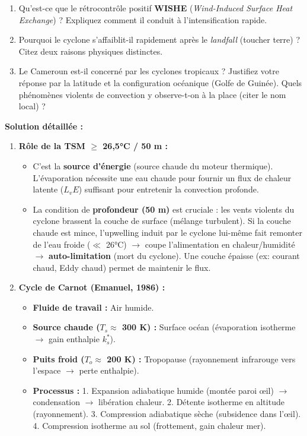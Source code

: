 \documentclass[11pt]{article}
\begin{document}
\begin{exoresolu}
\begin{enumerate}
    \item Qu'est-ce que le rétrocontrôle positif \textbf{WISHE} (\emph{Wind-Induced Surface Heat Exchange}) ? Expliquez comment il conduit à l'intensification rapide.
    \item Pourquoi le cyclone s'affaiblit-il rapidement après le \emph{landfall} (toucher terre) ? Citez deux raisons physiques distinctes.
    \item Le Cameroun est-il concerné par les cyclones tropicaux ? Justifiez votre réponse par la latitude et la configuration océanique (Golfe de Guinée). Quels phénomènes violents de convection y observe-t-on à la place (citer le nom local) ?
\end{enumerate}
\tcblower
\textbf{Solution détaillée :}
\begin{enumerate}
    \item \textbf{Rôle de la TSM $\ge$ 26,5°C / 50 m :}
          \begin{itemize}
              \item C'est la \textbf{source d'énergie} (source chaude du moteur thermique). L'évaporation nécessite une eau chaude pour fournir un flux de chaleur latente ($L_v E$) suffisant pour entretenir la convection profonde.
              \item La condition de \textbf{profondeur (50 m)} est cruciale : les vents violents du cyclone brassent la couche de surface (mélange turbulent). Si la couche chaude est mince, l'upwelling induit par le cyclone lui-même fait remonter de l'eau froide ($\ll$ 26°C) $\rightarrow$ coupe l'alimentation en chaleur/humidité $\rightarrow$ \textbf{auto-limitation} (mort du cyclone). Une couche épaisse (ex: courant chaud, Eddy chaud) permet de maintenir le flux.
          \end{itemize}
    \item \textbf{Cycle de Carnot (Emanuel, 1986) :}
          \begin{itemize}
              \item \textbf{Fluide de travail :} Air humide.
              \item \textbf{Source chaude ($T_s \approx$ 300 K) :} Surface océan (évaporation isotherme $\rightarrow$ gain enthalpie $k^*_s$).
              \item \textbf{Puits froid ($T_o \approx$ 200 K) :} Tropopause (rayonnement infrarouge vers l'espace $\rightarrow$ perte enthalpie).
              \item \textbf{Processus :} 1. Expansion adiabatique humide (montée paroi œil) $\rightarrow$ condensation $\rightarrow$ libération chaleur. 2. Détente isotherme en altitude (rayonnement). 3. Compression adiabatique sèche (subsidence dans l'œil). 4. Compression isotherme au sol (frottement, gain chaleur mer).

\end{itemize}
\end{enumerate}
\end{exoresolu}
\end{document}
